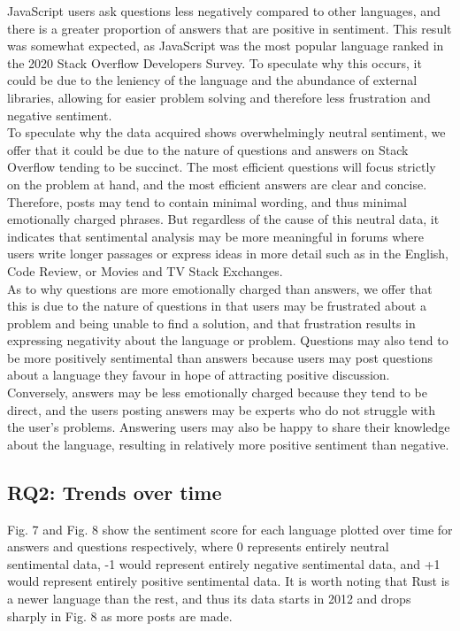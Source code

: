 \documentclass[conference]{IEEEtran}
\begin{document}
JavaScript users ask questions less negatively compared to other languages, and there is a greater proportion of answers that are positive in sentiment. This result was somewhat expected, as JavaScript was the most popular language ranked in the 2020 Stack Overflow Developers Survey\cite{b29}. To speculate why this occurs, it could be due to the leniency of the language and the abundance of external libraries, allowing for easier problem solving and therefore less frustration and negative sentiment. \\

To speculate why the data acquired shows overwhelmingly neutral sentiment, we offer that it could be due to the nature of questions and answers on Stack Overflow tending to be succinct. The most efficient questions will focus strictly on the problem at hand, and the most efficient answers are clear and concise. Therefore, posts may tend to contain minimal wording, and thus minimal emotionally charged phrases. But regardless of the cause of this neutral data, it indicates that sentimental analysis may be more meaningful in forums where users write longer passages or express ideas in more detail such as in the English, Code Review, or Movies and TV Stack Exchanges.\\

As to why questions are more emotionally charged than answers, we offer that this is due to the nature of questions in that users may be frustrated about a problem and being unable to find a solution, and that frustration results in expressing negativity about the language or problem. Questions may also tend to be more positively sentimental than answers because users may post questions about a language they favour in hope of attracting positive discussion. Conversely, answers may be less emotionally charged because they tend to be direct, and the users posting answers may be experts who do not struggle with the user’s problems. Answering users may also be happy to share their knowledge about the language, resulting in relatively more positive sentiment than negative.\\

\subsection{RQ2: Trends over time}
Fig. 7 and Fig. 8 show the sentiment score for each language plotted over time for answers and questions respectively, where 0 represents entirely neutral sentimental data, -1 would represent entirely negative sentimental data, and +1 would represent entirely positive sentimental data. It is worth noting that Rust is a newer language than the rest, and thus its data starts in 2012 and drops sharply in Fig. 8 as more posts are made. \\
\end{document}
